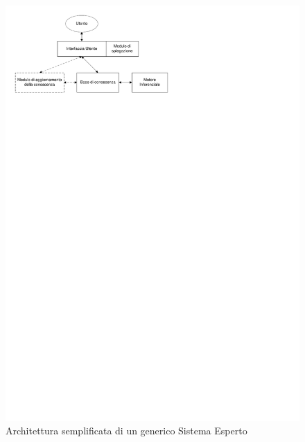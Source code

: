 \begin{figure}[h]
\centering
\includegraphics[viewport=19 667 329 824]{Immagini/Capitolo1/Architettura-SE.pdf}
\caption{Architettura semplificata di un generico Sistema Esperto}\label{fig:architettura-se}
\end{figure}

